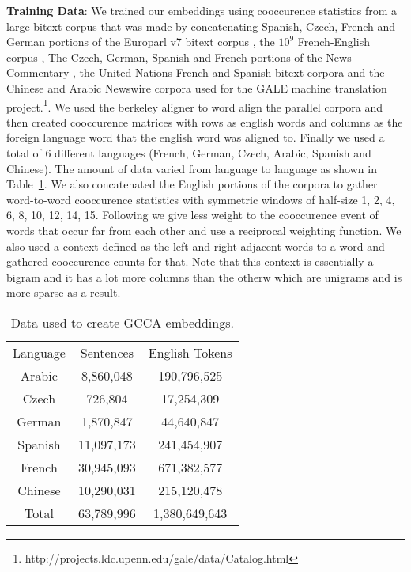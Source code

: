 \documentclass[11pt]{article}
\newcommand{\cwindow}{1, 2, 4, 6, 8, 10, 12, 14, 15}
\begin{document}
\textbf{Training Data}: We trained our embeddings using cooccurence
statistics from a large bitext corpus that was made by
concatenating Spanish, Czech, French and German portions of the
Europarl v7 bitext corpus \cite{koehn2005europarl}, the $10^9$
French-English corpus \cite{callisonburch2009findings}, The Czech,
German, Spanish and French portions of the News Commentary
\cite{koehn2007experiments}, the United Nations French and Spanish
bitext corpora \cite{eisele2010multiun} and the Chinese and Arabic
Newswire corpora used for the GALE machine translation
project.\footnote{{http://projects.ldc.upenn.edu/gale/data/Catalog.html}}. We
used the berkeley aligner to word align the parallel corpora and then
created cooccurence matrices with rows as english words and columns as
the foreign language word that the english word was aligned
to. Finally we used a total of 6 different languages (French, German,
Czech, Arabic, Spanish and Chinese). The amount of data varied from
language to language as shown in Table~\ref{tab:dataperlang}. We also
concatenated the English portions of the corpora to gather word-to-word cooccurence
statistics with symmetric windows of half-size \cwindow{}. Following
\cite{pennington2014glove} we give less weight to 
the cooccurence event of words that occur far from each other and use
a reciprocal weighting function. We also
used a context defined as the left and right adjacent words to a word
and gathered cooccurence counts for that. Note that this context is
essentially a bigram and it has a lot more columns than the otherw
which are unigrams and is more sparse as a result. 


\begin{table}[htbp]
  \centering
  \begin{tabular}{ccc}
    Language & Sentences & English Tokens \\
    Arabic   & 8,860,048   & 190,796,525  \\
    Czech    & 726,804     & 17,254,309   \\
    German   & 1,870,847   & 44,640,847   \\
    Spanish  & 11,097,173  & 241,454,907  \\
    French   & 30,945,093  & 671,382,577  \\
    Chinese  & 10,290,031  & 215,120,478  \\
    Total    & 63,789,996  & 1,380,649,643  \\
  \end{tabular}  
  \caption{Data used to create GCCA embeddings.}
  \label{tab:dataperlang}
\end{table}
\end{document}
